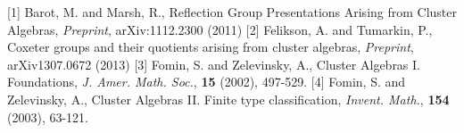 \documentclass{beamer}
\begin{document}
\begin{frame}
\begin{thebibliography}{69}

[1] Barot, M. and Marsh, R., Reflection Group Presentations Arising from Cluster Algebras, \emph{Preprint}, arXiv:1112.2300 (2011)
[2] Felikson, A. and Tumarkin, P., Coxeter groups and their quotients arising from cluster algebras, \emph{Preprint}, arXiv{1307.0672} (2013)
[3] Fomin, S. and Zelevinsky, A., Cluster Algebras I. Foundations, \emph{J. Amer. Math. Soc.}, \textbf{15} (2002), 497-529.
[4] Fomin, S. and Zelevinsky, A., Cluster Algebras II. Finite type classification, \emph{Invent. Math.}, \textbf{154} (2003), 63-121.

\end{thebibliography}

\end{frame}
\end{document}
